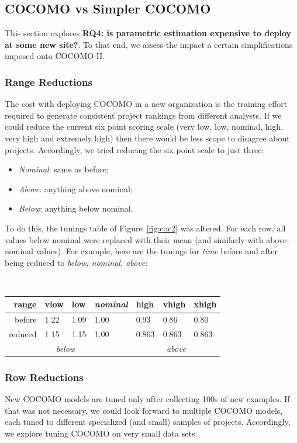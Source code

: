 \documentclass[smallcondesed]{svjour3}
\newcommand{\bi}{\begin{itemize}[leftmargin=0.4cm]}
\newcommand{\ei}{\end{itemize}}
\newcommand{\fig}[1]{Figure~\ref{fig:#1}}
\begin{document}




\subsection{COCOMO vs Simpler COCOMO}\label{sect:simpler}
This section explores {\bf RQ4:
is parametric estimation expensive to deploy
at some new site?}. To that end,
we assess the impact
a certain simplifications imposed onto COCOMO-II. 




\subsubsection{Range Reductions}
The cost with deploying COCOMO in a new
organization is the training effort required to generate consistent project
rankings from different analysts. If we could reduce 
the current six
point scoring scale (very low, low, nominal, high, very high and extremely high)
then there would be less scope 
to disagree about projects. 
Accordingly,  we tried
reducing the  six point scale to just three:
\bi
\item {\em Nominal}: same as before;
\item {\em Above}: anything above nominal;
\item {\em Below}: anything below nominal.
\ei
To do  this, the tunings table of
\fig{coc2} was altered. For each row, all values
below nominal were replaced with their mean (and
similarly with above-nominal values).  For example,
here are the tunings for {\em time} before and after
being reduced to {\em below, nominal, above}:

{\small   
~~~~~~\begin{tabular}{r|ll|l|lll|}
      range      & vlow&  low&{\em nominal}&high&vhigh&xhigh\\\hline
     before & 1.22& 1.09& 1.00& 0.93& 0.86& 0.80\\
     reduced&1.15& 1.15& 1.00&  0.863& 0.863&0.863\\\cline{2-3}\cline{5-7}
                 & \multicolumn{2}{c|}{{\em below}} &&\multicolumn{3}{c|}{{\em above}}
\end{tabular}
 }
\subsubsection{Row Reductions}\label{sect:row}
New COCOMO models are tuned only after collecting
100s of new examples. If that was not necessary, we could look forward to multiple
COCOMO models, each tuned to different specialized (and small) samples of projects.
Accordingly, we explore tuning COCOMO
on very small data sets.
\end{document}
